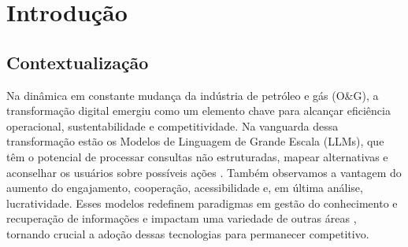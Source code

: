 
\chapter{Introdução}





\section{Contextualização}

Na dinâmica em constante mudança da indústria de petróleo e gás (O\&G), a transformação digital emergiu como um elemento chave para alcançar eficiência operacional, sustentabilidade e competitividade.
Na vanguarda dessa transformação estão os Modelos de Linguagem de Grande Escala (LLMs), que têm o potencial de processar consultas não estruturadas, mapear alternativas e aconselhar os usuários sobre possíveis ações \cite{Kar2023}.
Também observamos a vantagem do aumento do engajamento, cooperação, acessibilidade e, em última análise, lucratividade.
Esses modelos redefinem paradigmas em gestão do conhecimento e recuperação de informações e impactam uma variedade de outras áreas \cite{Eckroth2023}, tornando crucial a adoção dessas tecnologias para permanecer competitivo.

